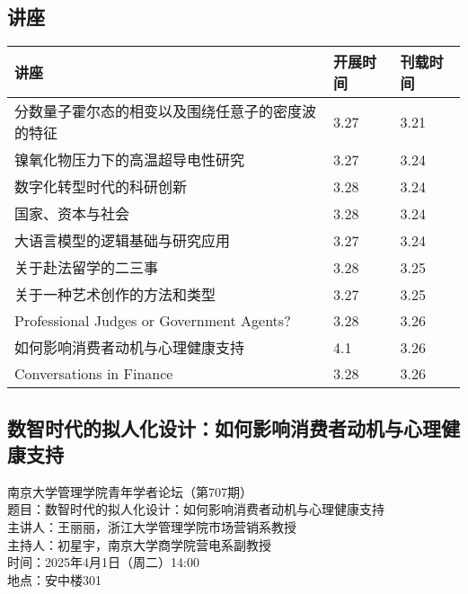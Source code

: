 \documentclass[letterpaper, 12pt]{article}
\begin{document}
\begin{multicols}{2}
\pagebreak

\section{讲座}
\begin{tabular}{|>{\centering\arraybackslash}m{}|m{}|m{}|}
    \hline
    讲座 & 开展时间 & 刊载时间\\
    \hline\hline
    分数量子霍尔态的相变以及围绕任意子的密度波的特征 & 3.27 & 3.21\\\hline
    镍氧化物压力下的高温超导电性研究 & 3.27 & 3.24\\\hline
    数字化转型时代的科研创新 & 3.28 & 3.24\\\hline
    国家、资本与社会 & 3.28 & 3.24\\\hline
    大语言模型的逻辑基础与研究应用 & 3.27 & 3.24\\\hline
    关于赴法留学的二三事 & 3.28 & 3.25\\\hline
    关于一种艺术创作的方法和类型 & 3.27 & 3.25\\\hline
    Professional Judges or Government Agents? & 3.28 & 3.26\\\hline
    如何影响消费者动机与心理健康支持 & 4.1 & 3.26\\\hline
    Conversations in Finance & 3.28 & 3.26\\\hline
\end{tabular}

\subsection{数智时代的拟人化设计：如何影响消费者动机与心理健康支持}
南京大学管理学院青年学者论坛（第707期）
\\题目：数智时代的拟人化设计：如何影响消费者动机与心理健康支持
\\主讲人：王丽丽，浙江大学管理学院市场营销系教授
\\主持人：初星宇，南京大学商学院营电系副教授
\\时间：2025年4月1日（周二）14:00
\\地点：安中楼301



\end{multicols}
\end{document}
